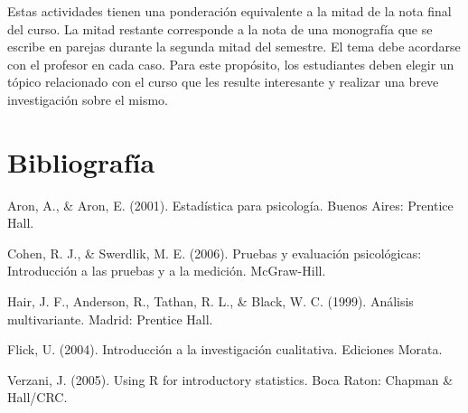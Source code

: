 \documentclass[letterpaper,11pt]{article}
\begin{document}
Estas actividades tienen una ponderación equivalente a la mitad de la nota final del curso. La mitad restante corresponde a la nota de una monograf\'ia que se escribe en parejas durante la segunda mitad del semestre. El tema debe acordarse con el profesor en cada caso. Para este prop\'osito, los estudiantes deben elegir un t\'opico relacionado con el curso que les resulte interesante y realizar una breve investigaci\'on sobre el mismo.


\section{Bibliograf\'ia}

{\leftskip 0.5in
\parindent -0.5in

Aron, A., \& Aron, E. (2001). Estad\'istica para psicolog\'ia. Buenos Aires: Prentice Hall.

Cohen, R. J., \& Swerdlik, M. E. (2006). Pruebas y evaluaci\'on psicol\'ogicas: Introducci\'on a las pruebas y a la medici\'on. McGraw-Hill.

Hair, J. F., Anderson, R., Tathan, R. L., \& Black, W. C. (1999). An\'alisis multivariante. Madrid: Prentice Hall.

Flick, U. (2004). Introducci\'on a la investigaci\'on cualitativa. Ediciones Morata.

Verzani, J. (2005). Using R for introductory statistics. Boca Raton: Chapman \& Hall/CRC.

}
\end{document}
